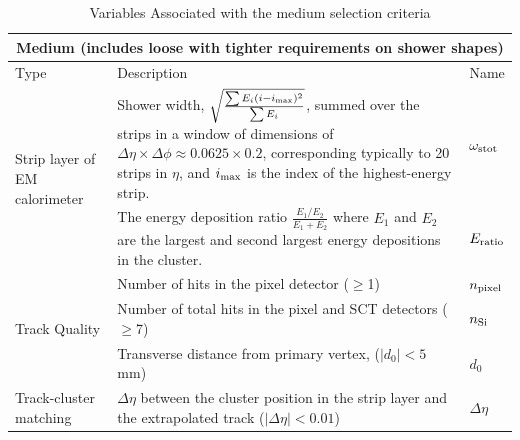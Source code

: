 \documentclass{article}
\begin{document}
\begin{table}[h!t]
\centering
\caption{ Variables Associated with the medium selection criteria \cite{ElectronPerformanceMeasurements}\label{table:mediumVariables}}
\begin{tabular}{|p{5cm}|p{8cm}|p{1cm}| } 
\hline
\multicolumn{3}{|c|}{\textbf{Medium (includes loose with tighter requirements on shower shapes)}} \\\hline
Type&Description&Name		    \\\hline
\multirow{2}{*}{Strip layer of EM calorimeter} & Shower width, $\sqrt{ \frac{\sum E_i (i-i_{\rm{max}})^2 } {\sum E_i} }$, summed over the strips in a window of dimensions of $\Delta\eta\times\Delta\phi\approx 0.0625\times0.2$, corresponding typically to 20 strips in $\eta$, and $i_{\rm{max}}$ is the index of the highest-energy strip. & $\omega_{\rm{stot}}$ \\\cline{2-3}
& The energy deposition ratio $\frac{E_1/E_2}{E_1+E_2}$ where $E_1$ and $E_2$ are the largest and second largest energy depositions in the cluster. & $E_{\rm{ratio}}$ \\\hline
\multirow{3}{*}{Track Quality} & Number of hits in the pixel detector ($\geq$1)&$n_{\rm{pixel}}$ \\\cline{2-3}
& Number of total hits in the pixel and SCT detectors ($\geq$7) & $n_{\rm{Si}}$ \\\cline{2-3}
& Transverse distance from primary vertex, ($|d_0|<5\,$mm) & $d_0$ \\\hline
Track-cluster matching & $\Delta\eta$ between the cluster position in the strip layer and the extrapolated track ($|\Delta\eta|<0.01$) & $\Delta\eta$\\\hline
\end{tabular}
\end{table}
\end{document}
